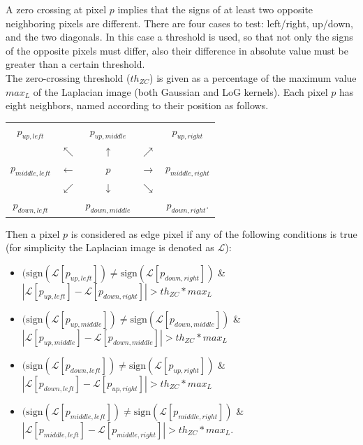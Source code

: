 \documentclass{ipol}
\numberwithin{equation}{section}
\numberwithin{table}{section}
\numberwithin{figure}{section}
\begin{document}
A zero crossing at pixel $p$ implies that the signs of at least two opposite neighboring pixels are 
different. There are four cases to test: left/right, up/down, and the two diagonals. In this case 
a threshold is used, so that not only the signs of the opposite pixels must differ, also their 
difference in absolute value must be greater than a certain threshold. \\

The zero-crossing threshold ($th_{ZC}$) is given as a percentage of the maximum value $max_L$ of the Laplacian 
image (both Gaussian and LoG kernels). Each pixel $p$ has eight neighbors, named according to their position 
as follows.

\begin{center}
\begin{tabular}{ c c c c c }
	$p_{up,left}$		& 					& $p_{up,middle}$	&					& $p_{up,right}$ 		\\
						& $\nwarrow$		& $\uparrow$		& $\nearrow$		&						\\
	$p_{middle,left}$	& $\leftarrow$		& $p$				& $\rightarrow$		& $p_{middle,right}$	\\
						& $\swarrow$		& $\downarrow$		& $\searrow$		&						\\
	$p_{down,left}$		&					& $p_{down,middle}$	&					& $p_{down,right}$.		\\  
\end{tabular}
\end{center}

Then a pixel $p$ is considered as edge pixel if any of the following conditions is true 
(for simplicity the Laplacian image is denoted as $\mathcal{L}$):
\begin{itemize}
	\item $(\mbox{sign}(\mathcal{L}[p_{up,left}])\neq\mbox{sign}(\mathcal{L}[p_{down,right}])$ \& $|\mathcal{L}[p_{up,left}]-\mathcal{L}[p_{down,right}]|>th_{ZC}*max_L$
	\item $(\mbox{sign}(\mathcal{L}[p_{up,middle}])\neq\mbox{sign}(\mathcal{L}[p_{down,middle}])$ \& $|\mathcal{L}[p_{up,middle}]-\mathcal{L}[p_{down,middle}]|>th_{ZC}*max_L$
	\item $(\mbox{sign}(\mathcal{L}[p_{down,left}])\neq\mbox{sign}(\mathcal{L}[p_{up,right}])$ \& $|\mathcal{L}[p_{down,left}]-\mathcal{L}[p_{up,right}]|>th_{ZC}*max_L$
	\item $(\mbox{sign}(\mathcal{L}[p_{middle,left}])\neq\mbox{sign}(\mathcal{L}[p_{middle,right}])$ \& $|\mathcal{L}[p_{middle,left}]-\mathcal{L}[p_{middle,right}]|>th_{ZC}*max_L$. \\
\end{itemize}
\end{document}
